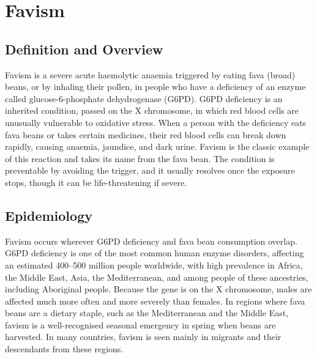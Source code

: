 \chapter{Favism}

\section*{Definition and Overview}
Favism is a severe acute haemolytic anaemia triggered by eating fava (broad) beans, or by inhaling their pollen, in people who have a deficiency of an enzyme called glucose-6-phosphate dehydrogenase (G6PD). G6PD deficiency is an inherited condition, passed on the X chromosome, in which red blood cells are unusually vulnerable to oxidative stress. When a person with the deficiency eats fava beans or takes certain medicines, their red blood cells can break down rapidly, causing anaemia, jaundice, and dark urine. Favism is the classic example of this reaction and takes its name from the fava bean. The condition is preventable by avoiding the trigger, and it usually resolves once the exposure stops, though it can be life-threatening if severe.

\section*{Epidemiology}
Favism occurs wherever G6PD deficiency and fava bean consumption overlap. G6PD deficiency is one of the most common human enzyme disorders, affecting an estimated 400--500 million people worldwide, with high prevalence in Africa, the Middle East, Asia, the Mediterranean, and among people of these ancestries, including Aboriginal people. Because the gene is on the X chromosome, males are affected much more often and more severely than females. In regions where fava beans are a dietary staple, such as the Mediterranean and the Middle East, favism is a well-recognised seasonal emergency in spring when beans are harvested. In many countries, favism is seen mainly in migrants and their descendants from these regions.

